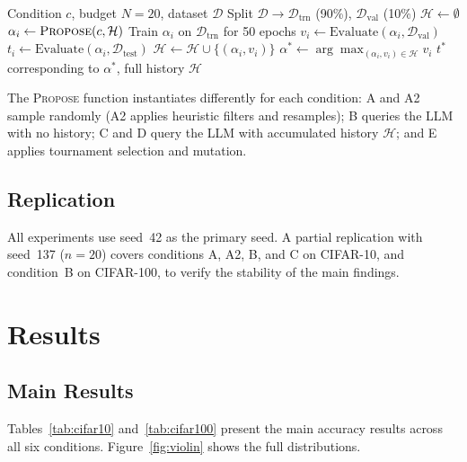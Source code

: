 \documentclass[10pt]{article}
\begin{document}
\begin{algorithm}[t]
\caption{Unified Architecture Evaluation}
\label{alg:framework}
\small
\begin{algorithmic}[1]
\REQUIRE Condition $c$, budget $N{=}20$, dataset $\mathcal{D}$
\STATE Split $\mathcal{D} \to \mathcal{D}_\text{trn}$ (90\%), $\mathcal{D}_\text{val}$ (10\%)
\STATE $\mathcal{H} \gets \emptyset$
  \STATE $\alpha_i \gets \textsc{Propose}(c, \mathcal{H})$
  \STATE Train $\alpha_i$ on $\mathcal{D}_\text{trn}$ for 50 epochs
  \STATE $v_i \gets \text{Evaluate}(\alpha_i, \mathcal{D}_\text{val})$
  \STATE $t_i \gets \text{Evaluate}(\alpha_i, \mathcal{D}_\text{test})$
  \STATE $\mathcal{H} \gets \mathcal{H} \cup \{(\alpha_i, v_i)\}$
\ENDFOR
\STATE $\alpha^* \gets \arg\max_{(\alpha_i,v_i)\in\mathcal{H}} v_i$ \hfill{}
\RETURN $t^*$ corresponding to $\alpha^*$, full history $\mathcal{H}$
\end{algorithmic}
\end{algorithm}

The \textsc{Propose} function instantiates differently for each condition: A and
A2 sample randomly (A2 applies heuristic filters and resamples); B queries the
LLM with no history; C and D query the LLM with accumulated history
$\mathcal{H}$; and E applies tournament selection and mutation.

\subsection{Replication}

All experiments use seed~42 as the primary seed.  A partial replication with
seed~137 ($n{=}20$) covers conditions A, A2, B, and C on CIFAR-10, and
condition~B on CIFAR-100, to verify the stability of the main findings.

\section{Results}
\label{sec:results}

\subsection{Main Results}
\label{sec:mainresults}

Tables~\ref{tab:cifar10} and~\ref{tab:cifar100} present the main accuracy
results across all six conditions.  Figure~\ref{fig:violin} shows the full
distributions.
\end{document}
